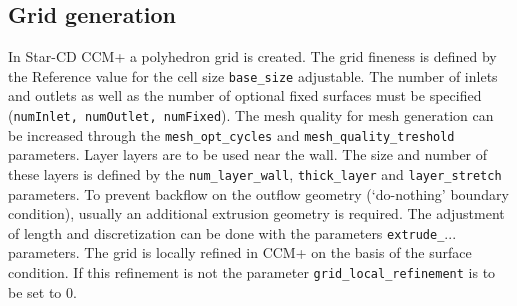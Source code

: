 \documentclass[oneside]{article}
\numberwithin{equation}{section}
\numberwithin{figure}{section}
\numberwithin{figure}{section}
\begin{document}
\subsection{Grid generation}
In Star-CD CCM+ a polyhedron grid is created. The grid fineness is defined by the Reference value for the cell size \verb|base_size| adjustable. The number of inlets and outlets as well as the number of optional fixed surfaces must be specified (\texttt{numInlet, numOutlet, numFixed}). The mesh quality for mesh generation can be increased through the \verb|mesh_opt_cycles| and \verb|mesh_quality_treshold| parameters. Layer layers are to be used near the wall. The size and number of these layers is defined by the \verb|num_layer_wall|, \verb|thick_layer| and \verb|layer_stretch| parameters. To prevent backflow on the outflow geometry (`do-nothing' boundary condition), usually an additional extrusion geometry is required. The adjustment of length and discretization can be done with the parameters \verb|extrude_|... parameters. The grid is locally refined in CCM+ on the basis of the surface condition. If this refinement is not the parameter \verb|grid_local_refinement| is to be set to 0.
\end{document}
